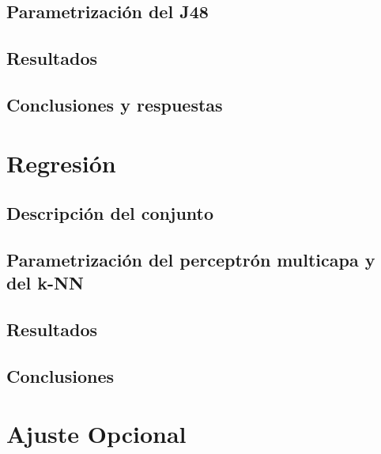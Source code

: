 \documentclass[a4paper, 11pt, twoside, openany, onecolumn, final]{memoir}
\begin{document}
	\section{Parametrización del J48}
	\section{Resultados}
	\section{Conclusiones y respuestas}
	\chapter{Regresión}
		\section{Descripción del conjunto}
	\section{Parametrización del perceptrón multicapa y del k-NN}
	\section{Resultados}
	\section{Conclusiones}
	\chapter{Ajuste Opcional}
\end{document}
